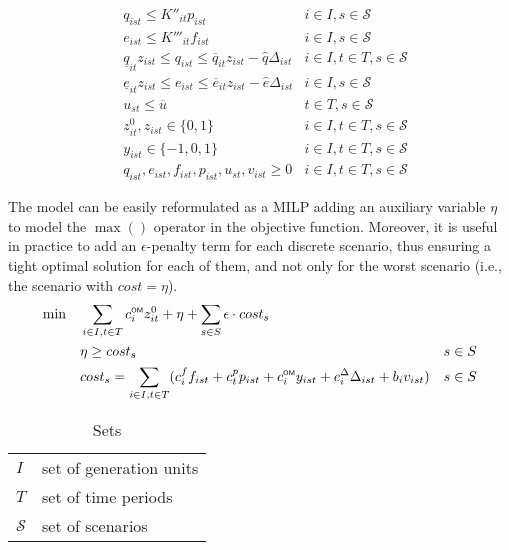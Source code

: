 \documentclass[a4paper,11pt,italian]{article}
\theoremstyle{changebreak}                %
\newcommand{\OM}{\mbox{\sf \tiny OM}}
\begin{document}
\begin{eqnarray}[rlr]
                  & q_{ist}\leq K''_{it}p_{ist}& i\in I, s \in\mathcal{S}\\
                  & e_{ist}\leq K'''_{it}f_{ist}& i\in I, s \in\mathcal{S}\\
                  & \underline{q}_{it}z_{ist}\leq q_{ist} \leq \overline{q}_{it}z_{ist} - \hat{q}\Delta_{ist} & i\in I,t \in T, s \in\mathcal{S}\\
                  & \underline{e}_{it}z_{ist}\leq e_{ist} \leq \overline{e}_{it}z_{ist}  - \hat{e}\Delta_{ist}& i\in I, s \in\mathcal{S}\\
                  & u_{st}\leq\overline{u}&t\in T,s\in\mathcal{S}\\
                  & z_{it}^0, z_{ist}\in\{0,1\}& i\in I, t\in T, s \in\mathcal{S}  \\
                  & y_{ist}\in\{-1,0,1\}& i\in I, t\in T, s \in\mathcal{S} \\
                  & q_{ist},e_{ist},f_{ist},p_{ist},u_{st},v_{ist}\geq0& i\in I, t\in T, s \in\mathcal{S} 
\end{eqnarray}

The model can be easily reformulated as a MILP adding an auxiliary variable $\eta$ to model the $\max()$ operator in the objective function. 
Moreover, it is useful in practice to add an $\epsilon$-penalty term for each discrete scenario, thus ensuring a tight optimal solution for each of them, and not only for the worst scenario (i.e., the scenario with $cost = \eta$).
\begin{eqnarray}[rlr]
    \min \quad & \sum_{i \in I, t \in T}c_{i}^{\OM}z_{it}^0 + \eta + \sum_{s \in S}\epsilon\cdot cost_s\\ 
               & \eta \ge cost_s & s\in S\\
               & cost_s = \sum_{i\in I, t\in T}(c_i^ff_{ist} +  c_t^pp_{ist} + c_i^{\OM}y_{ist} + c_i^\Delta\Delta_{ist} + b_iv_{ist} ) &  s\in S\\
\end{eqnarray}

\begin{table}[h]
    \caption{Sets}
\begin{tabular}{l l}
    $I$ & set of generation units\\
    $T$ & set of time periods\\
    $\mathcal{S}$ & set of scenarios
\end{tabular}
\end{table}
\end{document}
